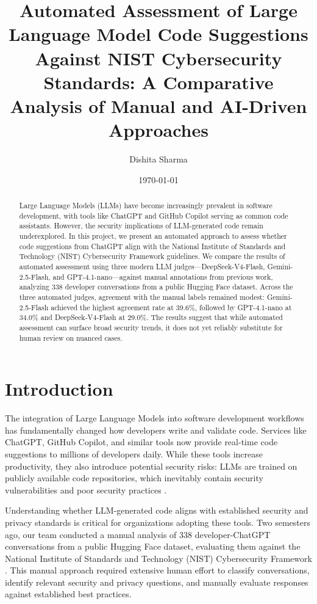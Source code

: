 \documentclass[12pt]{article}
\title{Automated Assessment of Large Language Model Code Suggestions Against NIST Cybersecurity Standards: A Comparative Analysis of Manual and AI-Driven Approaches}
\author{Dishita Sharma}
\date{\today}
\begin{document}
 
\maketitle
 
\begin{abstract}
 
Large Language Models (LLMs) have become increasingly prevalent in software development, with tools like ChatGPT and GitHub Copilot serving as common code assistants. However, the security implications of LLM-generated code remain underexplored. In this project, we present an automated approach to assess whether code suggestions from ChatGPT align with the National Institute of Standards and Technology (NIST) Cybersecurity Framework guidelines. We compare the results of automated assessment using three modern LLM judges---DeepSeek-V4-Flash, Gemini-2.5-Flash, and GPT-4.1-nano---against manual annotations from previous work, analyzing 338 developer conversations from a public Hugging Face dataset. Across the three automated judges, agreement with the manual labels remained modest: Gemini-2.5-Flash achieved the highest agreement rate at 39.6\%, followed by GPT-4.1-nano at 34.0\% and DeepSeek-V4-Flash at 29.0\%. The results suggest that while automated assessment can surface broad security trends, it does not yet reliably substitute for human review on nuanced cases.
 
\end{abstract}
 
\section{Introduction}
 
The integration of Large Language Models into software development workflows has fundamentally changed how developers write and validate code. Services like ChatGPT, GitHub Copilot, and similar tools now provide real-time code suggestions to millions of developers daily. While these tools increase productivity, they also introduce potential security risks: LLMs are trained on publicly available code repositories, which inevitably contain security vulnerabilities and poor security practices \citep{pearce2022asleep, sandoval2023empirical}.
 
Understanding whether LLM-generated code aligns with established security and privacy standards is critical for organizations adopting these tools. Two semesters ago, our team conducted a manual analysis of 338 developer-ChatGPT conversations from a public Hugging Face dataset, evaluating them against the National Institute of Standards and Technology (NIST) Cybersecurity Framework \citep{nist2018framework}. This manual approach required extensive human effort to classify conversations, identify relevant security and privacy questions, and manually evaluate responses against established best practices.
 
\end{document}
